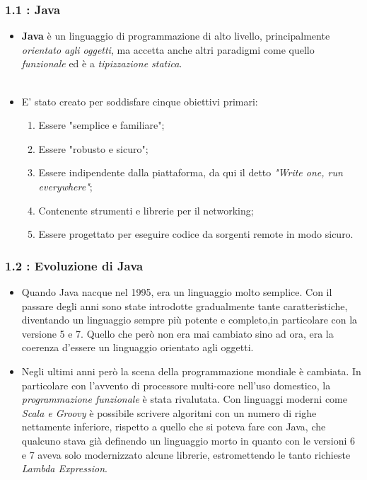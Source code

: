 \documentclass{beamer}
\begin{document}
\begin{frame}
	\frametitle{\textbf{1.1 : Java}}
	\begin{itemize}
		\item
			\textbf{Java} è un linguaggio di programmazione di alto livello, principalmente \textit{orientato agli oggetti}, ma accetta anche altri paradigmi come quello \textit{funzionale} ed è a \textit{tipizzazione statica}.\\\
		\item
			E' stato creato per soddisfare cinque obiettivi primari:
			\begin{enumerate}
				\item
					Essere "semplice e familiare";
				\item
					Essere "robusto e sicuro";
				\item
					Essere indipendente dalla piattaforma, da qui il detto \textit{"Write one, run everywhere"};
				\item
					Contenente strumenti e librerie per il networking;
				\item
					Essere progettato per eseguire codice da sorgenti remote in modo sicuro.
			\end{enumerate}
	\end{itemize}
\end{frame}


\begin{frame}
	\frametitle{\textbf{1.2 : Evoluzione di Java}}
		\begin{itemize}
			\item
				Quando Java nacque nel 1995, era un linguaggio molto semplice. Con il passare degli anni sono state introdotte gradualmente tante caratteristiche, diventando un linguaggio sempre più potente e completo,in particolare con la versione 5 e 7. Quello che però non era mai cambiato sino ad ora, era la coerenza d'essere un linguaggio orientato agli oggetti.
			\item 
				Negli ultimi anni però la scena della programmazione mondiale è cambiata. In particolare con l'avvento di processore multi-core nell'uso domestico, la \textit{programmazione funzionale} è stata rivalutata. Con linguaggi moderni come \textit{Scala e Groovy} è possibile scrivere algoritmi con un numero di righe nettamente inferiore, rispetto a quello che si poteva fare con Java, che qualcuno stava già definendo un linguaggio morto in quanto con le versioni 6 e 7 aveva solo modernizzato alcune librerie, estromettendo le tanto richieste \textit{Lambda Expression}.
		\end{itemize}
\end{frame}
\end{document}
